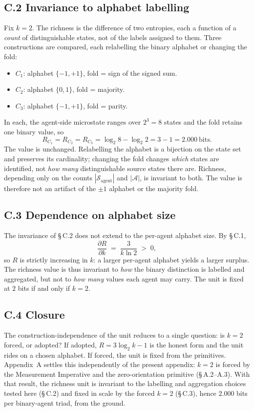\documentclass[11pt,oneside]{report}
\theoremstyle{definition}
\theoremstyle{remark}
\begin{document}
\subsection*{C.2 Invariance to alphabet labelling}
Fix \ensuremath{k = 2}. The richness is the difference of two entropies, each a function of a
\emph{count} of distinguishable states, not of the labels assigned to them. Three constructions are
compared, each relabelling the binary alphabet or changing the fold:
\begin{itemize}
\item \ensuremath{C_1}: alphabet \ensuremath{\{-1, +1\}}, fold = sign of the signed sum.
\item \ensuremath{C_2}: alphabet \ensuremath{\{0, 1\}}, fold = majority.
\item \ensuremath{C_3}: alphabet \ensuremath{\{-1, +1\}}, fold = parity.
\end{itemize}
In each, the agent-side microstate ranges over \ensuremath{2^{3} = 8} states and the fold retains one
binary value, so
\[
  R_{C_1} = R_{C_2} = R_{C_3} = \log_2 8 - \log_2 2 = 3 - 1 = 2.000 \ \text{bits.}
\]
The value is unchanged. Relabelling the alphabet is a bijection on the state set and preserves its
cardinality; changing the fold changes \emph{which} states are identified, not \emph{how many}
distinguishable source states there are. Richness, depending only on the counts
\ensuremath{|\mathcal{S}_{\text{agent}}|} and \ensuremath{|\mathcal{A}|}, is invariant to both. The
value is therefore not an artifact of the \ensuremath{\pm 1} alphabet or the majority fold.

\subsection*{C.3 Dependence on alphabet size}
The invariance of \S\,C.2 does not extend to the per-agent alphabet size. By \S\,C.1,
\[
  \frac{\partial R}{\partial k} \;=\; \frac{3}{k \ln 2} \;>\; 0,
\]
so \ensuremath{R} is strictly increasing in \ensuremath{k}: a larger per-agent alphabet yields a larger
surplus. The richness value is thus invariant to \emph{how} the binary distinction is labelled and
aggregated, but not to \emph{how many} values each agent may carry. The unit is fixed at
\ensuremath{2} bits if and only if \ensuremath{k = 2}.

\subsection*{C.4 Closure}
The construction-independence of the unit reduces to a single question: is \ensuremath{k = 2} forced,
or adopted? If adopted, \ensuremath{R = 3\log_2 k - 1} is the honest form and the unit rides on a
chosen alphabet. If forced, the unit is fixed from the primitives. Appendix~A settles this
independently of the present appendix: \ensuremath{k = 2} is forced by the Measurement Imperative and
the zero-orientation primitive (\S\,A.2--A.3). With that result, the richness unit is invariant to the
labelling and aggregation choices tested here (\S\,C.2) and fixed in scale by the forced
\ensuremath{k = 2} (\S\,C.3), hence \ensuremath{2.000} bits per binary-agent triad, from the ground.
\end{document}
